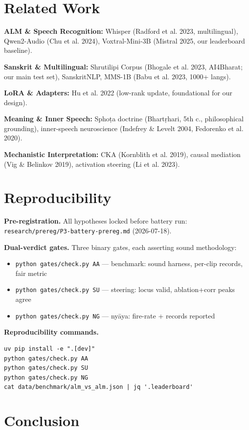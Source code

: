 \documentclass[11pt]{article}
\begin{document}
\section{Related Work}

\textbf{ALM \& Speech Recognition:} Whisper (Radford et al. 2023, multilingual), Qwen2-Audio (Chu et al. 2024), Voxtral-Mini-3B (Mistral 2025, our leaderboard baseline).

\textbf{Sanskrit \& Multilingual:} Shrutilipi Corpus (Bhogale et al. 2023, AI4Bharat; our main test set), SanskritNLP, MMS-1B (Babu et al. 2023, 1000+ langs).

\textbf{LoRA \& Adapters:} Hu et al. 2022 (low-rank update, foundational for our design).

\textbf{Meaning \& Inner Speech:} Sphoṭa doctrine (Bhartṛhari, 5th c., philosophical grounding), inner-speech neuroscience (Indefrey \& Levelt 2004, Fedorenko et al. 2020).

\textbf{Mechanistic Interpretation:} CKA (Kornblith et al. 2019), causal mediation (Vig \& Belinkov 2019), activation steering (Li et al. 2023).

\section{Reproducibility}

\textbf{Pre-registration.} All hypotheses locked before battery run: \texttt{research/prereg/P3-battery-prereg.md} (2026-07-18).

\textbf{Dual-verdict gates.} Three binary gates, each asserting sound methodology:
\begin{itemize}
\item \texttt{python gates/check.py AA} --- benchmark: sound harness, per-clip records, fair metric
\item \texttt{python gates/check.py SU} --- steering: locus valid, ablation+corr peaks agree
\item \texttt{python gates/check.py NG} --- nyāya: fire-rate + records reported
\end{itemize}

\textbf{Reproducibility commands.}
\begin{verbatim}
uv pip install -e ".[dev]"
python gates/check.py AA
python gates/check.py SU
python gates/check.py NG
cat data/benchmark/alm_vs_alm.json | jq '.leaderboard'
\end{verbatim}

\section{Conclusion}
\end{document}

